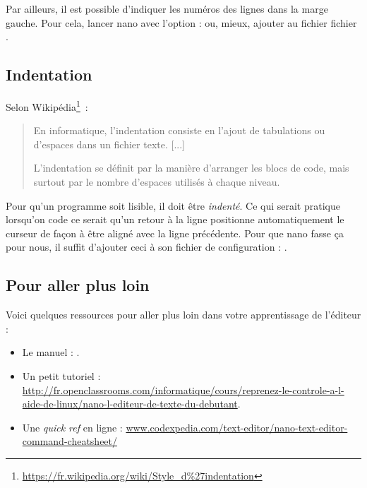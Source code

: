 \documentclass[a4paper,11pt]{style-esi/td}
\begin{document}
		Par ailleurs, il est possible d'indiquer les numéros des 
		lignes dans la
		marge gauche. Pour cela, lancer nano avec l'option 
		 :  ou, mieux, 
	    ajouter  au fichier 
	    fichier .
			
	\subsection{Indentation}
				 
        Selon Wikipédia\footnote{\url{https://fr.wikipedia.org/wiki/Style_d\%27indentation}}~:
        \begin{quote}
        En informatique, l'indentation consiste en l'ajout de tabulations ou 
        d'espaces dans un fichier texte. [...]

        L'indentation se définit par la manière d'arranger les blocs de code, 
        mais surtout par le nombre d'espaces utilisés à chaque niveau. 
        \end{quote}
        
		Pour qu'un programme soit lisible, 
		il doit être \textit{indenté}. 
		Ce qui serait pratique lorsqu'on code ce serait qu'un retour à la ligne 
		positionne automatiquement le curseur de façon à être aligné avec la ligne précédente. 
		Pour que nano fasse ça pour nous, 
		il suffit d'ajouter	ceci à son fichier de configuration : .
			
	\subsection{Pour aller plus loin} 
		
		Voici quelques ressources pour aller plus loin dans votre apprentissage de l'éditeur :
		\begin{itemize}
		\item Le manuel : .
		\item Un petit tutoriel : 
			\\{\tiny\url{http://fr.openclassrooms.com/informatique/cours/reprenez-le-controle-a-l-aide-de-linux/nano-l-editeur-de-texte-du-debutant}}.
		\item Une \textit{quick ref} en ligne : 
		\url{www.codexpedia.com/text-editor/nano-text-editor-command-cheatsheet/}
		\end{itemize}	

\end{document}
